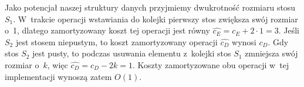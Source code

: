 Jako potencjał naszej struktury danych przyjmiemy dwukrotność rozmiaru stosu $S_1$.
W~trakcie operacji wstawiania do kolejki pierwszy stos zwiększa swój rozmiar o~1, dlatego zamortyzowany koszt tej operacji jest równy $\widehat{c_E}=c_E+2\cdot1=3$.
Jeśli $S_2$ jest stosem niepustym, to koszt zamortyzowany operacji  $\widehat{c_D}$ wynosi $c_D$.
Gdy stos $S_2$ jest pusty, to podczas usuwania elementu z~kolejki stos $S_1$ zmniejsza swój rozmiar o~$k$, więc $\widehat{c_D}=c_D-2k=1$.
Koszty zamortyzowane obu operacji w~tej implementacji wynoszą zatem $O(1)$.

\exercise %
